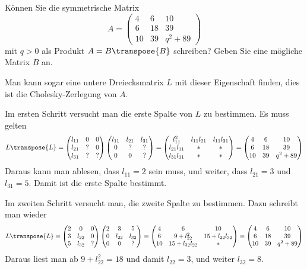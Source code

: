 Können Sie die symmetrische Matrix
\[
A=\begin{pmatrix}
 4& 6&10\\
 6&18&39\\
10&39&q^2 + 89
\end{pmatrix}
\]
mit $q>0$ als Produkt $A=B\transpose{B}$ schreiben?
Geben Sie eine mögliche Matrix $B$ an.


\begin{loesung}
Man kann sogar eine untere Dreiecksmatrix $L$ mit dieser Eigenschaft finden,
dies ist die Cholesky-Zerlegung von $A$.

Im ersten Schritt versucht man die erste Spalte von $L$ zu bestimmen.
Es muss gelten
\[
L\transpose{L}=
\begin{pmatrix}
l_{11}&  0&  0\\
l_{21}&  ?&  0\\
l_{31}&  ?&  ?
\end{pmatrix}
\begin{pmatrix}
l_{11}&l_{21}&l_{31}\\
     0&     ?&     ?\\
     0&     0&     ?
\end{pmatrix}
=
\begin{pmatrix}
    l_{11}^2&l_{11}l_{21}&l_{11}l_{31}\\
l_{21}l_{11}&           *&           *\\
l_{31}l_{11}&           *&           *
\end{pmatrix}
=
\begin{pmatrix}
 4& 6&10\\
 6&18&39\\
10&39&q^2 + 89
\end{pmatrix}
\]
Daraus kann man ablesen, dass $l_{11}=2$ sein muss, und weiter,
dass
$l_{21}=3$ und $l_{31}=5$. Damit ist die erste Spalte bestimmt.

Im zweiten Schritt versucht man, die zweite Spalte zu bestimmen.
Dazu schreibt man wieder
\[
L\transpose{L}
=
\begin{pmatrix}
2&     0&0\\
3&l_{22}&0\\
5&l_{32}&?
\end{pmatrix}
\begin{pmatrix}
2&     3&     5\\
0&l_{22}&l_{32}\\
0&     0&?
\end{pmatrix}
=
\begin{pmatrix}
 4&              6&            10\\
 6& 9+l_{22}^2    &15+l_{22}l_{32}\\
10&15+l_{32}l_{22}&             *
\end{pmatrix}
=
\begin{pmatrix}
 4& 6&10\\
 6&18&39\\
10&39& q^2 + 89
\end{pmatrix}
\]
Daraus liest man ab $9+l_{22}^2=18$ und damit $l_{22}=3$, und weiter
$l_{32}=8$.


\end{loesung}
